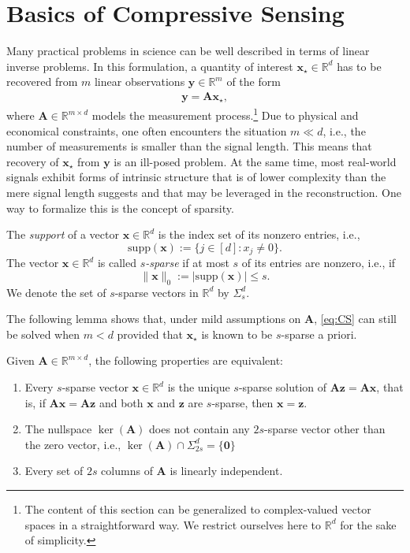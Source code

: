 \documentclass{svproc}
\newcommand{\bA}{\boldsymbol{A}}
\newcommand{\bx}{\boldsymbol{x}}
\newcommand{\by}{\boldsymbol{y}}
\newcommand{\bz}{\boldsymbol{z}}
\newcommand{\0}{\boldsymbol{0}}
\newcommand{\1}{\boldsymbol{1}}
\def\supp{\mathrm{supp}}
\def\N{\mathbb{N}}
\def\R{\mathbb{R}}
\begin{document}
\section{Basics of Compressive Sensing}
\label{sec:Basics-CS}
 
Many practical problems in science can be well described in terms of linear inverse problems. In this formulation, a quantity of interest $\bx_\star \in \R^d$ has to be recovered from $m$ linear observations $\by \in \R^m$ of the form
\begin{align}
    \label{eq:CS}
    \by = \bA\bx_\star,
\end{align}
where $\bA \in \R^{m\times d}$ models the measurement process.\footnote{The content of this section can be generalized to complex-valued vector spaces in a straightforward way. We restrict ourselves here to $\R^d$ for the sake of simplicity.} Due to physical and economical constraints, one often encounters the situation $m \ll d$, i.e., the number of measurements is smaller than the signal length. This means that recovery of $\bx_\star$ from $\by$ is an ill-posed problem. At the same time, most real-world signals exhibit forms of intrinsic structure that is of lower complexity than the mere signal length suggests and that
may be leveraged in the reconstruction. One way to formalize this is the concept of sparsity.

\begin{definition}
\label{def:Sparsity}
The {\em support} of a vector  $\bx \in \R^d$ is 
the index set of its nonzero entries, i.e.,
$$
\supp(\bx) := \{ j \in [d]: x_j \not= 0 \}.
$$
The vector $\bx \in \R^d$ is called {\em $s$-sparse} if at most $s$ of its entries are nonzero,
i.e., if \label{eq:L0}
$$
\|\bx\|_0 := |\supp(\bx)| \le s.
$$ 
We denote the set of $s$-sparse vectors in $\R^d$ by $\Sigma_s^d$.
\end{definition}

The following lemma shows that, under mild assumptions on $\bA$, \eqref{eq:CS} can still be solved when $m < d$ provided that $\bx_\star$ is known to be $s$-sparse a priori.

\begin{lemma} \label{lem:MinimalMeasurements}
	Given $\bA \in \R^{m\times d}$, the following properties are equivalent:
	\begin{enumerate}
		\item[(i)] Every $s$-sparse vector $\bx \in \R^d$ is the unique $s$-sparse solution of $\bA\bz = \bA\bx$, that is, if $\bA\bx = \bA\bz$ and both $\bx$ and $\bz$ are $s$-sparse, then $\bx = \bz$.
		\item[(ii)] The nullspace $\ker(\bA)$ does not contain any $2s$-sparse vector other than the zero vector, i.e., $\ker(\bA) \cap \Sigma_{2s}^d = \{ \0 \}$
		\item[(iii)] Every set of $2s$ columns of $\bA$ is linearly independent.
	\end{enumerate}
\end{lemma}
\end{document}
